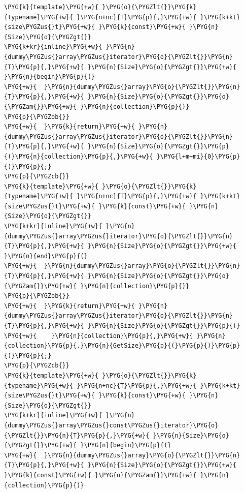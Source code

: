 \begin{codeblockbg}
\begin{Verbatim}[commandchars=\\\{\},breaklines=true,breakanywhere=true,fontsize=\codefont,xleftmargin=17bp]
\PYG{k}{template}\PYG{+w}{ }\PYG{o}{\PYGZlt{}}\PYG{k}{typename}\PYG{+w}{ }\PYG{n+nc}{T}\PYG{p}{,}\PYG{+w}{ }\PYG{k+kt}{size\PYGZus{}t}\PYG{+w}{ }\PYG{k}{const}\PYG{+w}{ }\PYG{n}{Size}\PYG{o}{\PYGZgt{}}
\PYG{k+kr}{inline}\PYG{+w}{ }\PYG{n}{dummy\PYGZus{}array\PYGZus{}iterator}\PYG{o}{\PYGZlt{}}\PYG{n}{T}\PYG{p}{,}\PYG{+w}{ }\PYG{n}{Size}\PYG{o}{\PYGZgt{}}\PYG{+w}{ }\PYG{n}{begin}\PYG{p}{(}
\PYG{+w}{  }\PYG{n}{dummy\PYGZus{}array}\PYG{o}{\PYGZlt{}}\PYG{n}{T}\PYG{p}{,}\PYG{+w}{ }\PYG{n}{Size}\PYG{o}{\PYGZgt{}}\PYG{o}{\PYGZam{}}\PYG{+w}{ }\PYG{n}{collection}\PYG{p}{)}
\PYG{p}{\PYGZob{}}
\PYG{+w}{  }\PYG{k}{return}\PYG{+w}{ }\PYG{n}{dummy\PYGZus{}array\PYGZus{}iterator}\PYG{o}{\PYGZlt{}}\PYG{n}{T}\PYG{p}{,}\PYG{+w}{ }\PYG{n}{Size}\PYG{o}{\PYGZgt{}}\PYG{p}{(}\PYG{n}{collection}\PYG{p}{,}\PYG{+w}{ }\PYG{l+m+mi}{0}\PYG{p}{)}\PYG{p}{;}
\PYG{p}{\PYGZcb{}}
\PYG{k}{template}\PYG{+w}{ }\PYG{o}{\PYGZlt{}}\PYG{k}{typename}\PYG{+w}{ }\PYG{n+nc}{T}\PYG{p}{,}\PYG{+w}{ }\PYG{k+kt}{size\PYGZus{}t}\PYG{+w}{ }\PYG{k}{const}\PYG{+w}{ }\PYG{n}{Size}\PYG{o}{\PYGZgt{}}
\PYG{k+kr}{inline}\PYG{+w}{ }\PYG{n}{dummy\PYGZus{}array\PYGZus{}iterator}\PYG{o}{\PYGZlt{}}\PYG{n}{T}\PYG{p}{,}\PYG{+w}{ }\PYG{n}{Size}\PYG{o}{\PYGZgt{}}\PYG{+w}{ }\PYG{n}{end}\PYG{p}{(}
\PYG{+w}{  }\PYG{n}{dummy\PYGZus{}array}\PYG{o}{\PYGZlt{}}\PYG{n}{T}\PYG{p}{,}\PYG{+w}{ }\PYG{n}{Size}\PYG{o}{\PYGZgt{}}\PYG{o}{\PYGZam{}}\PYG{+w}{ }\PYG{n}{collection}\PYG{p}{)}
\PYG{p}{\PYGZob{}}
\PYG{+w}{  }\PYG{k}{return}\PYG{+w}{ }\PYG{n}{dummy\PYGZus{}array\PYGZus{}iterator}\PYG{o}{\PYGZlt{}}\PYG{n}{T}\PYG{p}{,}\PYG{+w}{ }\PYG{n}{Size}\PYG{o}{\PYGZgt{}}\PYG{p}{(}
\PYG{+w}{    }\PYG{n}{collection}\PYG{p}{,}\PYG{+w}{ }\PYG{n}{collection}\PYG{p}{.}\PYG{n}{GetSize}\PYG{p}{(}\PYG{p}{)}\PYG{p}{)}\PYG{p}{;}
\PYG{p}{\PYGZcb{}}
\PYG{k}{template}\PYG{+w}{ }\PYG{o}{\PYGZlt{}}\PYG{k}{typename}\PYG{+w}{ }\PYG{n+nc}{T}\PYG{p}{,}\PYG{+w}{ }\PYG{k+kt}{size\PYGZus{}t}\PYG{+w}{ }\PYG{k}{const}\PYG{+w}{ }\PYG{n}{Size}\PYG{o}{\PYGZgt{}}
\PYG{k+kr}{inline}\PYG{+w}{ }\PYG{n}{dummy\PYGZus{}array\PYGZus{}const\PYGZus{}iterator}\PYG{o}{\PYGZlt{}}\PYG{n}{T}\PYG{p}{,}\PYG{+w}{ }\PYG{n}{Size}\PYG{o}{\PYGZgt{}}\PYG{+w}{ }\PYG{n}{begin}\PYG{p}{(}
\PYG{+w}{  }\PYG{n}{dummy\PYGZus{}array}\PYG{o}{\PYGZlt{}}\PYG{n}{T}\PYG{p}{,}\PYG{+w}{ }\PYG{n}{Size}\PYG{o}{\PYGZgt{}}\PYG{+w}{ }\PYG{k}{const}\PYG{+w}{ }\PYG{o}{\PYGZam{}}\PYG{+w}{ }\PYG{n}{collection}\PYG{p}{)}

\end{Verbatim}
\end{codeblockbg}
